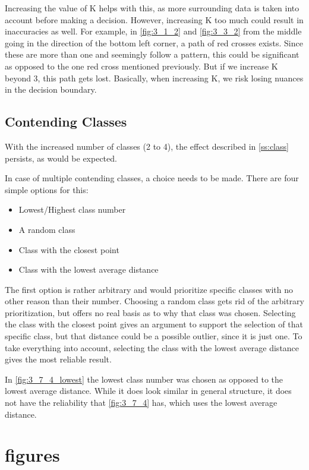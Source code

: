 \documentclass[10pt,a4paper]{article}
\begin{document}
Increasing the value of K helps with this, as more surrounding data is taken into account before making a decision. However, increasing K too much could result in inaccuracies as well. For example, in \autoref{fig:3_1_2} and \autoref{fig:3_3_2} from the middle going in the direction of the bottom left corner, a path of red crosses exists. Since these are more than one and seemingly follow a pattern, this could be significant as opposed to the one red cross mentioned previously. But if we increase K beyond 3, this path gets lost. Basically, when increasing K, we risk losing nuances in the decision boundary.

\subsection{Contending Classes}
With the increased number of classes (2 to 4), the effect described in \autoref{ss:class} persists, as would be expected.

In case of multiple contending classes, a choice needs to be made. There are four simple options for this:
\begin{itemize}
\item Lowest/Highest class number
\item A random class
\item Class with the closest point
\item Class with the lowest average distance
\end{itemize}

The first option is rather arbitrary and would prioritize specific classes with no other reason than their number. Choosing a random class gets rid of the arbitrary prioritization, but offers no real basis as to why that class was chosen.
Selecting the class with the closest point gives an argument to support the selection of that specific class, but that distance could be a possible outlier, since it is just one. To take everything into account, selecting the class with the lowest average distance gives the most reliable result.

In \autoref{fig:3_7_4_lowest} the lowest class number was chosen as opposed to the lowest average distance. While it does look similar in general structure, it does not have the reliability that \autoref{fig:3_7_4} has, which uses the lowest average distance.

\appendix
\section{figures}
\end{document}

